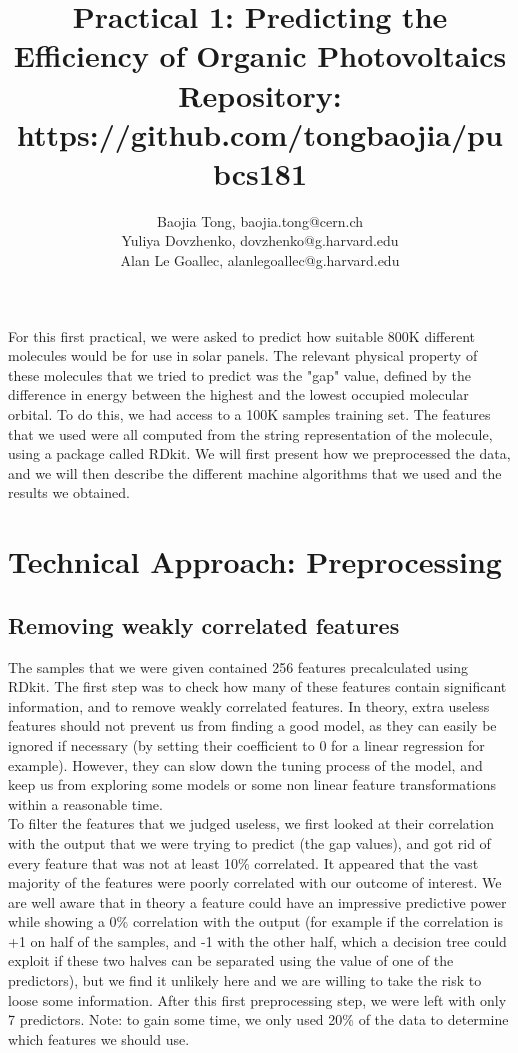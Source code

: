 \documentclass[11pt]{article}
\title{Practical 1: Predicting the Efficiency of Organic Photovoltaics\\Repository: https://github.com/tongbaojia/pubcs181}
\author{Baojia Tong, baojia.tong@cern.ch \\ Yuliya Dovzhenko, dovzhenko@g.harvard.edu \\ Alan Le Goallec, alanlegoallec@g.harvard.edu}
\begin{document}
\maketitle{}


\noindent For this first practical, we were asked to predict how suitable 800K different molecules would be
for use in solar panels. The relevant physical property of these molecules that we tried to predict
was the "gap" value, defined by the difference in energy between the highest and the lowest occupied molecular orbital.
To do this, we had access to a 100K samples training set. The features that we used were all computed from the 
string representation of the molecule, using a package called RDkit.
We will first present how we preprocessed the data, and we will then describe the different machine algorithms that we
used and the results we obtained.


\section{Technical Approach: Preprocessing}

  \subsection{Removing weakly correlated features}
    The samples that we were given contained 256 features precalculated using RDkit.
    The first step was to check how many of these features contain significant information, and to remove weakly correlated features.
    In theory, extra useless features should not prevent us from finding a good model, as they can easily
    be ignored if necessary (by setting their coefficient to 0 for a linear regression for example). However,
    they can slow down the tuning process of the model, and keep us from exploring some models or some non linear
    feature transformations within a reasonable time. \\
    To filter the features that we judged useless, we first looked at their correlation with the output that we were
    trying to predict (the gap values), and got rid of every feature that was not at least 10\% correlated.
    It appeared that the vast majority of the features were poorly correlated with our outcome of interest.
    We are well aware that in theory a feature could have an impressive predictive power while showing a 0\% correlation with
    the output (for example if the correlation is +1 on half of the samples, and -1 with the other half, which a decision tree could exploit
    if these two halves can be separated using the value of one of the predictors),
    but we find it unlikely here and we are willing to take the risk to loose some information.
    After this first preprocessing step, we were left with only 7 predictors.
    Note: to gain some time, we only used 20\% of the data to determine which features we should use.
\end{document}
